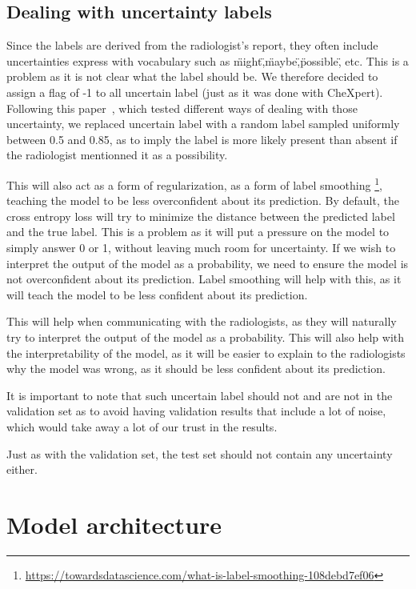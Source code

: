 \documentclass[11pt]{article}
\begin{document}
    \subsection{Dealing with uncertainty labels}



        Since the labels are derived from the radiologist's report, they often include uncertainties express with vocabulary such as \"might\",\"maybe\",\"possible\", etc.
        This is a problem as it is not clear what the label should be. We therefore decided to assign a flag of -1 to all uncertain label (just as it was done with CheXpert). Following this paper~\cite{hierarchical}, which tested different
        ways of dealing with those uncertainty, we replaced uncertain label with a random label sampled uniformly between 0.5 and 0.85, as to imply the label is more likely present than absent if the radiologist
        mentionned it as a possibility.

        This will also act as a form of regularization, as a form of label smoothing \footnote{\url{https://towardsdatascience.com/what-is-label-smoothing-108debd7ef06}}, teaching the model to
        be less overconfident about its prediction. By default, the cross entropy loss will try to minimize the distance between the predicted label and the true label. This is a problem as it will
        put a pressure on the model to simply answer 0 or 1, without leaving much room for uncertainty. If we wish to interpret the
        output of the model as a probability, we need to ensure the model is not overconfident about its prediction. Label smoothing will help with this, as it will teach the model to be less confident about its prediction.

        This will help when communicating with the radiologists, as they will naturally try to interpret the output of the model as a probability. This will also help with the interpretability of the model, as it will
        be easier to explain to the radiologists why the model was wrong, as it should be less confident about its prediction.

        It is important to note that such uncertain label should not and are not in the validation set as to avoid having validation results that include a lot of noise, which would take away a lot of our trust
        in the results.

        Just as with the validation set, the test set should not contain any uncertainty either.
    \section{Model architecture}
\end{document}
